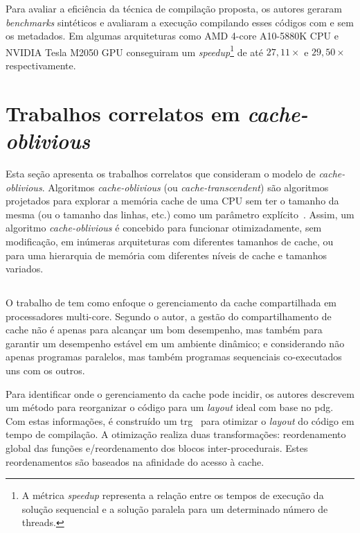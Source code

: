 Para avaliar a eficiência da técnica de compilação proposta, os autores geraram \textit{benchmarks} sintéticos e avaliaram a execução compilando esses códigos com e sem os metadados. Em algumas arquiteturas como AMD 4-core A10-5880K CPU e NVIDIA Tesla M2050 GPU conseguiram um \textit{speedup}\footnote{A métrica \textit{speedup} representa a relação entre os tempos de execução da solução sequencial e a solução paralela para um determinado número de threads.} de até $27,11 \times$ e $29,50 \times$ respectivamente.

\section{Trabalhos correlatos em \textit{cache-oblivious}}
\label{sec:trabalhos_cache_oblivous}

Esta seção apresenta os trabalhos correlatos que consideram o modelo de \textit{cache-oblivious}.
Algoritmos \textit{cache-oblivious} (ou \textit{cache-tran\-scen\-dent}) são algoritmos projetados para explorar a memória cache de uma CPU sem ter o tamanho da mesma (ou o tamanho das linhas, etc.) como um parâmetro explícito~\cite{frigo1999cache}. Assim, um algoritmo \textit{cache-oblivious} é concebido para funcionar otimizadamente, sem modificação, em inúmeras arquiteturas com diferentes tamanhos de cache, ou para uma hierarquia de memória com diferentes níveis de cache e tamanhos variados.

\subsection{}

O trabalho de  tem como enfoque o gerenciamento da cache compartilhada em processadores multi-core.
Segundo o autor, a gestão do compartilhamento de cache não é apenas para alcançar um bom desempenho, mas também para garantir um desempenho estável em um ambiente dinâmico; e considerando não apenas programas paralelos, mas também programas sequenciais co-executados uns com os outros.

Para identificar onde o gerenciamento da cache pode incidir, os autores descrevem um método para reorganizar o código para um \textit{layout} ideal com base no \ac{pdg}.
Com estas informações, é construído um \ac{trg}~\cite{gloy1999procedure} para otimizar o \textit{layout} do código em tempo de compilação.
A otimização realiza duas transformações: reordenamento global das funções e\@/\@ou reordenamento dos blocos inter-procedurais. Estes reordenamentos são baseados na afinidade do acesso à cache.

